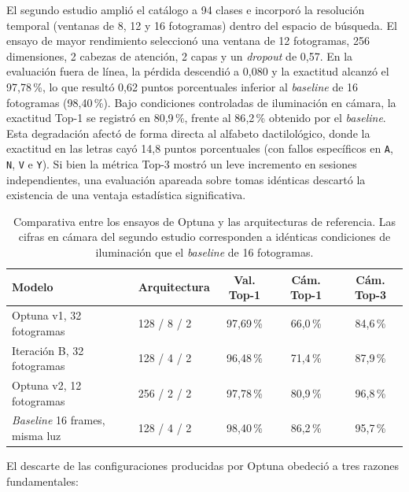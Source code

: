 El segundo estudio amplió el catálogo a 94 clases e incorporó la resolución temporal (ventanas de 8, 12 y 16 fotogramas) dentro del espacio de búsqueda. El ensayo de mayor rendimiento seleccionó una ventana de 12 fotogramas, 256 dimensiones, 2 cabezas de atención, 2 capas y un \textit{dropout} de 0{,}57. En la evaluación fuera de línea, la pérdida descendió a 0{,}080 y la exactitud alcanzó el 97{,}78\,\%, lo que resultó 0,62 puntos porcentuales inferior al \textit{baseline} de 16 fotogramas (98{,}40\,\%). Bajo condiciones controladas de iluminación en cámara, la exactitud Top-1 se registró en 80{,}9\,\%, frente al 86{,}2\,\% obtenido por el \textit{baseline}. Esta degradación afectó de forma directa al alfabeto dactilológico, donde la exactitud en las letras cayó 14,8 puntos porcentuales (con fallos específicos en \texttt{A}, \texttt{N}, \texttt{V} e \texttt{Y}). Si bien la métrica Top-3 mostró un leve incremento en sesiones independientes, una evaluación apareada sobre tomas idénticas descartó la existencia de una ventaja estadística significativa.

\begin{table}[H]
    \centering
    \small
    \caption{Comparativa entre los ensayos de Optuna y las arquitecturas de referencia. Las cifras en cámara del segundo estudio corresponden a idénticas condiciones de iluminación que el \textit{baseline} de 16 fotogramas.}
    \label{tab:optuna_vs_baseline}
    \begin{tabularx}{\textwidth}{Xlccc}
        \toprule
        \textbf{Modelo} & \textbf{Arquitectura} & \textbf{Val. Top-1} & \textbf{Cám. Top-1} & \textbf{Cám. Top-3} \\
        \midrule
        Optuna v1, 32 fotogramas & 128 / 8 / 2 & 97{,}69\,\% & 66{,}0\,\% & 84{,}6\,\% \\
        Iteración B, 32 fotogramas & 128 / 4 / 2 & 96{,}48\,\% & 71{,}4\,\% & 87{,}9\,\% \\
        Optuna v2, 12 fotogramas & 256 / 2 / 2 & 97{,}78\,\% & 80{,}9\,\% & 96{,}8\,\% \\
        \textit{Baseline} 16 frames, misma luz & 128 / 4 / 2 & 98{,}40\,\% & 86{,}2\,\% & 95{,}7\,\% \\
        \bottomrule
    \end{tabularx}
\end{table}

El descarte de las configuraciones producidas por Optuna obedeció a tres razones fundamentales:

